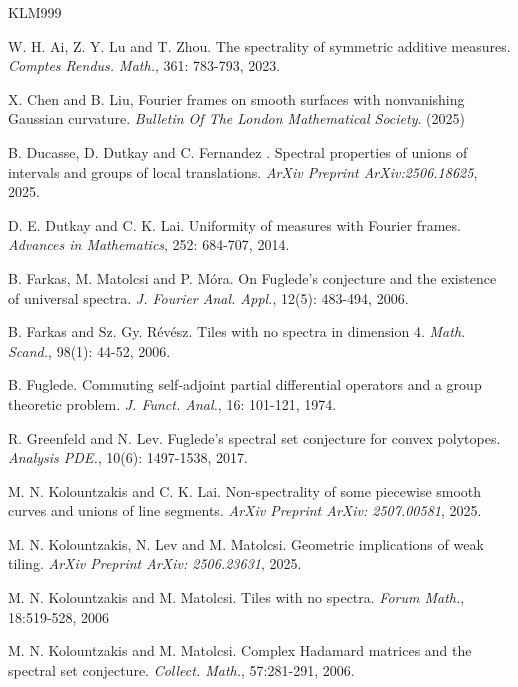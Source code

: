 \documentclass[12pt,a4paper,intlimits,sumlimits]{amsart}
\theoremstyle{plain}
\theoremstyle{definition}
\begin{document}

\begin{thebibliography}{KLM999}

  W. H. Ai, Z. Y. Lu and T. Zhou.  The spectrality of symmetric additive measures. {\em Comptes Rendus. Math.}, 361: 783-793, 2023.

 X. Chen and B. Liu, Fourier frames on smooth surfaces with nonvanishing Gaussian curvature. {\em Bulletin Of The London Mathematical Society}. (2025)

 B. Ducasse, D. Dutkay and  C. Fernandez . Spectral properties of unions of intervals and groups of local translations. {\em ArXiv Preprint ArXiv:2506.18625}, 2025.

D. E. Dutkay and C. K. Lai. Uniformity of measures with Fourier frames. {\em Advances in
Mathematics}, 252: 684-707, 2014.


 B. Farkas, M. Matolcsi and P. M\'{o}ra. On Fuglede's conjecture and the existence of universal spectra. {\em J. Fourier Anal. Appl.}, 12(5): 483-494, 2006.

 B. Farkas and Sz. Gy. R\'ev\'esz. Tiles with no spectra in dimension 4. {\em Math. Scand.},
98(1): 44-52, 2006.

 B. Fuglede. Commuting self-adjoint partial differential operators and a group theoretic problem.  {\em J. Funct.  Anal.}, 16: 101-121, 1974.

 R. Greenfeld and N. Lev. Fuglede's spectral set conjecture for convex polytopes. {\em Analysis PDE.}, 10(6): 1497-1538, 2017.


  M. N. Kolountzakis and C. K. Lai.  Non-spectrality of some piecewise smooth curves and unions of line segments. {\em ArXiv Preprint ArXiv: 2507.00581},  2025.

 M. N. Kolountzakis, N. Lev and M. Matolcsi. Geometric implications of weak tiling. {\em ArXiv Preprint ArXiv: 2506.23631}, 2025.
 
 M. N. Kolountzakis and M. Matolcsi. Tiles with no spectra. {\em Forum Math.}, 18:519-528, 2006

 M. N. Kolountzakis and M. Matolcsi. Complex Hadamard matrices and the spectral set conjecture. {\em Collect. Math.}, 57:281-291, 2006. 


\end{thebibliography}
\end{document}
